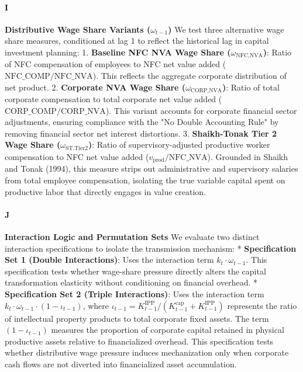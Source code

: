 \paragraph{I}
\textbf{Distributive Wage Share Variants ($\omega_{t-1}$)}
We test three alternative wage share measures, conditioned at lag 1 to reflect the historical lag in capital investment planning:
1. \textbf{Baseline NFC NVA Wage Share ($\omega_{\text{NFC,NVA}}$)}: Ratio of NFC compensation of employees to NFC net value added ($\text{NFC\_COMP} / \text{NFC\_NVA}$). This reflects the aggregate corporate distribution of net product.
2. \textbf{Corporate NVA Wage Share ($\omega_{\text{CORP,NVA}}$)}: Ratio of total corporate compensation to total corporate net value added ($\text{CORP\_COMP} / \text{CORP\_NVA}$). This variant accounts for corporate financial sector adjustments, ensuring compliance with the "No Double Accounting Rule" by removing financial sector net interest distortions.
3. \textbf{Shaikh-Tonak Tier 2 Wage Share ($\omega_{\text{ST,Tier2}}$)}: Ratio of supervisory-adjusted productive worker compensation to NFC net value added ($v_{\text{prod}} / \text{NFC\_NVA}$). Grounded in Shaikh and Tonak (1994), this measure strips out administrative and supervisory salaries from total employee compensation, isolating the true variable capital spent on productive labor that directly engages in value creation.

\paragraph{J}
\textbf{Interaction Logic and Permutation Sets}
We evaluate two distinct interaction specifications to isolate the transmission mechanism:
* \textbf{Specification Set 1 (Double Interactions)}: Uses the interaction term $k_t \cdot \omega_{t-1}$. This specification tests whether wage-share pressure directly alters the capital transformation elasticity without conditioning on financial overhead.
* \textbf{Specification Set 2 (Triple Interactions)}: Uses the interaction term $k_t \cdot \omega_{t-1} \cdot (1 - \iota_{t-1})$, where $\iota_{t-1} = K_{t-1}^{\text{IPP}} / (K_{t-1}^{\text{cap}} + K_{t-1}^{\text{IPP}})$ represents the ratio of intellectual property products to total corporate fixed assets. The term $(1 - \iota_{t-1})$ measures the proportion of corporate capital retained in physical productive assets relative to financialized overhead. This specification tests whether distributive wage pressure induces mechanization only when corporate cash flows are not diverted into financialized asset accumulation.

